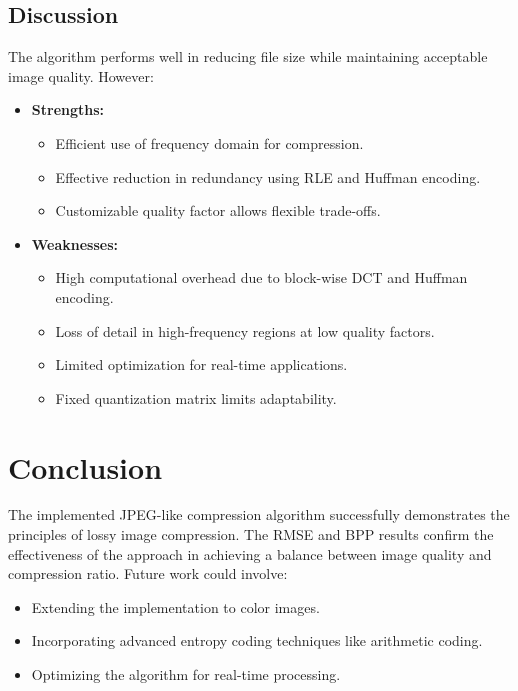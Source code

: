\documentclass{article}
\begin{document}
\subsection{Discussion}
The algorithm performs well in reducing file size while maintaining acceptable image quality. However:
\begin{itemize}
    \item \textbf{Strengths:} 
    \begin{itemize}
        \item Efficient use of frequency domain for compression.
        \item Effective reduction in redundancy using RLE and Huffman encoding.
        \item Customizable quality factor allows flexible trade-offs.
    \end{itemize}
    \item \textbf{Weaknesses:}
    \begin{itemize}
        \item High computational overhead due to block-wise DCT and Huffman encoding.
        \item Loss of detail in high-frequency regions at low quality factors.
        \item Limited optimization for real-time applications.
        \item Fixed quantization matrix limits adaptability.
    \end{itemize}
\end{itemize}

\section{Conclusion}
The implemented JPEG-like compression algorithm successfully demonstrates the principles of lossy image compression. The RMSE and BPP results confirm the effectiveness of the approach in achieving a balance between image quality and compression ratio. Future work could involve:
\begin{itemize}
    \item Extending the implementation to color images.
    \item Incorporating advanced entropy coding techniques like arithmetic coding.
    \item Optimizing the algorithm for real-time processing.
\end{itemize}
\end{document}
